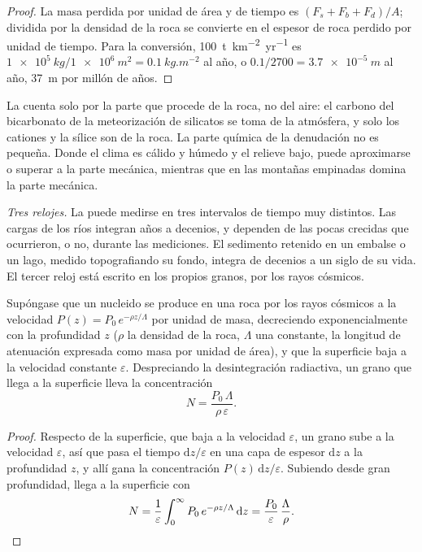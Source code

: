 \begin{proof}
La masa perdida por unidad de área y de tiempo es $(F_s + F_b + F_d)/A$; dividida por la densidad de la roca se convierte en el espesor de roca perdido por
unidad de tiempo. Para la conversión, \qty{100}{t.km^{-2}.yr^{-1}} es
$\qty{1e5}{kg}/\qty{1e6}{m^2} = \qty{0.1}{kg.m^{-2}}$ al año, o
$0.1/2700 = \qty{3.7e-5}{m}$ al año, \qty{37}{m} por millón de años.
\end{proof}

La  cuenta solo por la parte que procede de la roca, no del aire: el carbono del bicarbonato de la meteorización de silicatos se toma de la
atmósfera, y solo los cationes y la sílice son de la roca. La parte química de la denudación no es pequeña. Donde el clima es cálido y húmedo y el relieve
bajo, puede aproximarse o superar a la parte mecánica, mientras que en las montañas empinadas domina la parte mecánica.

\emph{Tres relojes.} La  puede medirse en tres intervalos de tiempo muy distintos. Las cargas de los ríos integran años a decenios, y
dependen de las pocas crecidas que ocurrieron, o no, durante las mediciones. El sedimento retenido en un embalse o un lago, medido topografiando su fondo,
integra de decenios a un siglo de su vida. El tercer reloj está escrito en los propios granos, por los rayos cósmicos.

\begin{proposition}\label{prop:b1:erosion-transport:cosmogenic}
Supóngase que un nucleido se produce en una roca por los rayos cósmicos a la velocidad
$P(z) = P_0\,e^{-\rho z/\Lambda}$ por unidad de masa, decreciendo exponencialmente con
la profundidad $z$ ($\rho$ la densidad de la roca, $\Lambda$ una constante, la
longitud de atenuación expresada como masa por unidad de área), y que la superficie baja a la velocidad constante $\varepsilon$. Despreciando la desintegración radiactiva,
un grano que llega a la superficie lleva la concentración
\[
  N = \frac{P_0\,\Lambda}{\rho\,\varepsilon}.
\]
\end{proposition}

\begin{proof}
Respecto de la superficie, que baja a la velocidad $\varepsilon$, un grano sube a la velocidad $\varepsilon$, así que pasa el tiempo $\mathrm dz/\varepsilon$
en una capa de espesor $\mathrm dz$ a la profundidad $z$, y allí gana la concentración $P(z)\,\mathrm dz/\varepsilon$. Subiendo desde gran profundidad, llega a la
superficie con
\[
  N = \frac{1}{\varepsilon}\int_0^{\infty} P_0\,e^{-\rho z/\Lambda}\,\mathrm dz
  = \frac{P_0}{\varepsilon}\,\frac{\Lambda}{\rho}. \qedhere
\]
\end{proof}

